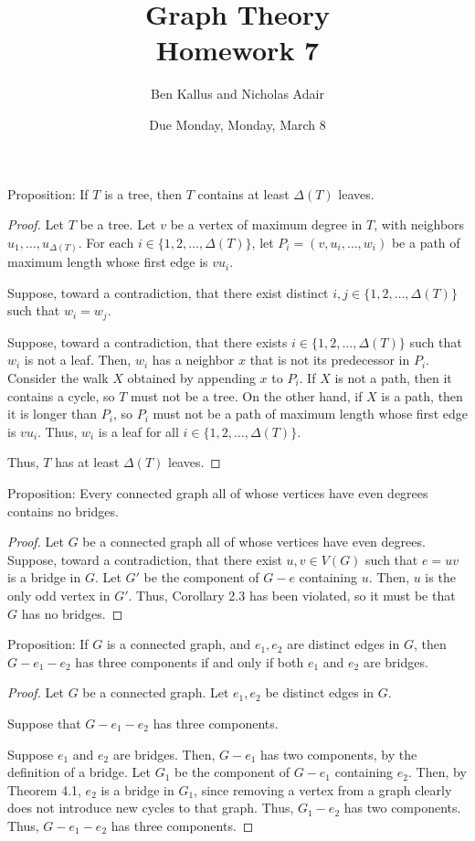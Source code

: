 \documentclass[12pt]{article}
\title{Graph Theory \\ Homework 7}
\author{Ben Kallus and Nicholas Adair}
\date{Due Monday, Monday, March 8}
\begin{document}
\maketitle

 Proposition: If $T$ is a tree, then $T$ contains at least $\Delta(T)$ leaves.
\begin{proof}
    Let $T$ be a tree.
    Let $v$ be a vertex of maximum degree in $T$, with neighbors $u_1, \hdots, u_{\Delta(T)}$.
    For each $i \in \{1,2,\hdots,\Delta(T)\}$, let $P_i = (v, u_i, \hdots, w_i)$ be a path of maximum length whose first edge is $vu_i$.

    Suppose, toward a contradiction, that there exist distinct $i,j \in \{1,2,\hdots,\Delta(T)\}$ such that $w_i = w_j$.

    Suppose, toward a contradiction, that there exists $i \in \{1,2,\hdots,\Delta(T)\}$ such that $w_i$ is not a leaf.
    Then, $w_i$ has a neighbor $x$ that is not its predecessor in $P_i$.
    Consider the walk $X$ obtained by appending $x$ to $P_i$.
    If $X$ is not a path, then it contains a cycle, so $T$ must not be a tree.
    On the other hand, if $X$ is a path, then it is longer than $P_i$, so $P_i$ must not be a path of maximum length whose first edge is $vu_i$.
    Thus, $w_i$ is a leaf for all $i \in \{1,2,\hdots,\Delta(T)\}$.

    Thus, $T$ has at least $\Delta(T)$ leaves.
\end{proof}

\newpage{} Proposition: Every connected graph all of whose vertices have even degrees contains no bridges.
\begin{proof}
    Let $G$ be a connected graph all of whose vertices have even degrees.
    Suppose, toward a contradiction, that there exist $u,v \in V(G)$ such that $e=uv$ is a bridge in $G$.
    Let $G'$ be the component of $G-e$ containing $u$.
    Then, $u$ is the only odd vertex in $G'$.
    Thus, Corollary 2.3 has been violated, so it must be that $G$ has no bridges.
\end{proof}

\newpage{} Proposition: If $G$ is a connected graph, and $e_1, e_2$ are distinct edges in $G$, then $G - e_1 - e_2$ has three components if and only if both $e_1$ and $e_2$ are bridges.
\begin{proof}
    Let $G$ be a connected graph.
    Let $e_1, e_2$ be distinct edges in $G$.

    Suppose that $G - e_1 - e_2$ has three components.

    Suppose $e_1$ and $e_2$ are bridges.
    Then, $G-e_1$ has two components, by the definition of a bridge.
    Let $G_1$ be the component of $G - e_1$ containing $e_2$.
    Then, by Theorem 4.1, $e_2$ is a bridge in $G_1$, since removing a vertex from a graph clearly does not introduce new cycles to that graph. %
    Thus, $G_1 - e_2$ has two components.
    Thus, $G - e_1 - e_2$ has three components.
\end{proof}
\end{document}
